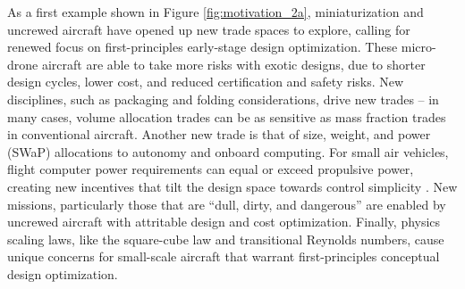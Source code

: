 As a first example shown in Figure \ref{fig:motivation_2a}, miniaturization and uncrewed aircraft have opened up new trade spaces to explore, calling for renewed focus on first-principles early-stage design optimization. These micro-drone aircraft are able to take more risks with exotic designs, due to shorter design cycles, lower cost, and reduced certification and safety risks. New disciplines, such as packaging and folding considerations, drive new trades -- in many cases, volume allocation trades can be as sensitive as mass fraction trades in conventional aircraft. Another new trade is that of size, weight, and power (SWaP) allocations to autonomy and onboard computing. For small air vehicles, flight computer power requirements can equal or exceed propulsive power, creating new incentives that tilt the design space towards control simplicity \cite{sudhakar_balancing_2020}. New missions, particularly those that are ``dull, dirty, and dangerous'' are enabled by uncrewed aircraft with attritable design and cost optimization. Finally, physics scaling laws, like the square-cube law and transitional Reynolds numbers, cause unique concerns for small-scale aircraft that warrant first-principles conceptual design optimization.

